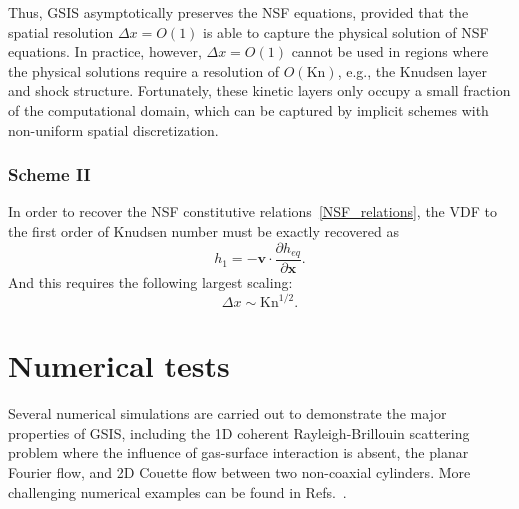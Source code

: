 Thus, GSIS asymptotically preserves the NSF equations, provided that the spatial resolution $\Delta{x}=O(1)$ is able to capture the physical solution of NSF equations.  In practice, however, $\Delta{x}=O(1)$ cannot be used in regions where the physical solutions require a resolution of $O(\text{Kn})$, e.g., the  Knudsen layer and shock structure. Fortunately, these kinetic layers only occupy a small fraction of the computational domain, which can be captured by implicit schemes with non-uniform spatial discretization. 







 


\subsubsection{Scheme II}

In order to recover the NSF constitutive relations~\eqref{NSF_relations}, the VDF to the first order of Knudsen number must be exactly recovered as
\begin{equation}
h_1=-\bm{v}\cdot\frac{\partial{h_{eq}}}{\partial\bm{x}}.
\end{equation}
And this requires the following largest scaling:
\begin{equation}\label{scaling2}
\Delta{x}\sim{\text{Kn}^{1/2}}.
\end{equation}




\section{Numerical tests} \label{sec:results1}

Several numerical simulations are carried out to demonstrate the major properties of GSIS, including the 1D coherent Rayleigh-Brillouin scattering problem where the influence of gas-surface interaction is absent, the planar Fourier flow, and 2D Couette flow between two non-coaxial cylinders. More challenging numerical examples can be found in Refs.~\cite{SuArXiv2019, Su2020SIAM, Su2021CMAME, Su2020CAF, Zhu2021JCP}.



